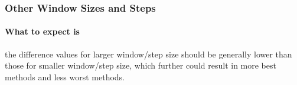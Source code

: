 \subsubsection{Other Window Sizes and Steps}

\paragraph{What to expect is}
the difference values for larger window/step size should be generally lower than
those for smaller window/step size, which further could result in more best
methods and less worst methods.

\begin{landscape}
\renewcommand*{\arraystretch}{.9}  %
\begin{table}[]
\centering
\caption{Equal-weight 120 Ma $\mathcal{CPD}s$ for the three representative continents' paleomagnetic APWPs compared with their FHM predicted APWPs. The best are in dark green and underlined, second best in green and third in light green.}\label{tab-pk0vs1bs}
\end{table}
\end{landscape}
